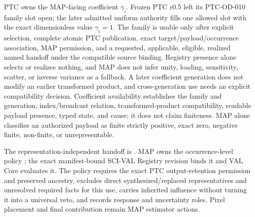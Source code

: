 \documentclass[10pt]{article}
\begin{document}
PTC owns the MAP-facing coefficient \(\gamma_i\). Frozen PTC r0.5 left its
PTC-OD-010 family slot open; the later admitted uniform authority fills one
allowed slot with the exact dimensionless value \(\gamma_i=1\). The family is
usable only after explicit selection, complete atomic PTC publication, exact
target/payload/occurrence association, MAP permission, and a requested,
applicable, eligible, realized named handoff under the compatible source
binding. Registry presence alone selects or realizes nothing, and MAP does not
infer unity, loading, sensitivity, scatter, or inverse variance as a fallback.
A later coefficient generation does not modify an earlier transformed
product, and cross-generation use needs an explicit compatibility decision.
Coefficient availability establishes the family and generation,
index/broadcast relation, transformed-product compatibility, readable payload
presence, typed state, and cause; it does not claim finiteness. MAP alone
classifies an authorized payload as finite strictly positive, exact zero,
negative finite, non-finite, or unrepresentable.

The representation-independent handoff is
\SCIMapPTCMapBoundaryId. MAP owns the occurrence-level policy
\SCIMapUpstreamProfile; the exact manifest-bound SCI-VAL Registry revision binds it
and VAL Core evaluates it. The policy requires the exact PTC output-retention
permission and preserved ancestry, excludes direct synthesized/replaced
representatives and unresolved required facts for this use, carries inherited
influence without turning it into a universal veto, and records response and
uncertainty roles. Pixel placement and final contribution remain MAP
estimator actions.
\end{document}
